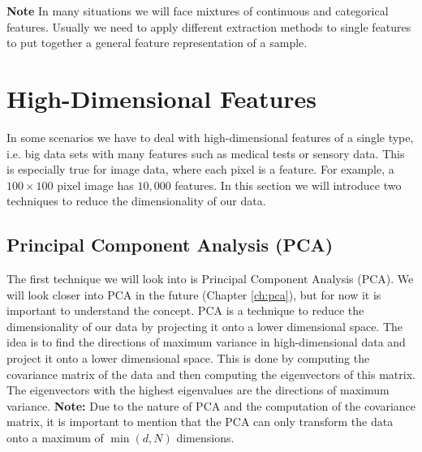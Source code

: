 \textbf{Note} In many situations we will face mixtures of continuous and categorical features. Usually we need to apply different extraction methods
to single features to put together a general feature representation of a sample.

\section{High-Dimensional Features}
In some scenarios we have to deal with high-dimensional features of a single type, i.e. big data sets with many features such as medical tests or sensory data.
This is especially true for image data, where each pixel is a feature. For example, a $100 \times 100$ pixel image has $10,000$ features.
In this section we will introduce two techniques to reduce the dimensionality of our data.
\subsection{Principal Component Analysis (PCA)}
The first technique we will look into is Principal Component Analysis (PCA). We will look closer into PCA in the future (Chapter \ref{ch:pca}), but for now it is important to understand the concept.
PCA is a technique to reduce the dimensionality of our data by projecting it onto a lower dimensional space.
The idea is to find the directions of maximum variance in high-dimensional data and project it onto a lower dimensional space.
This is done by computing the covariance matrix of the data and then computing the eigenvectors of this matrix.
The eigenvectors with the highest eigenvalues are the directions of maximum variance.\newline
\textbf{Note:} Due to the nature of PCA and the computation of the covariance matrix, it is important to mention that the PCA can only transform the data onto a maximum of $\min(d, N)$ dimensions.


